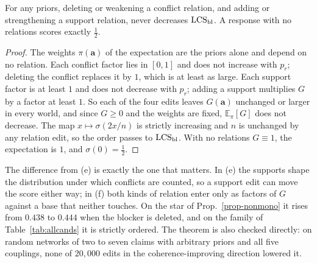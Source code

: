 \begin{theorem}
\label{thm-balanced}
For any priors, deleting or weakening a conflict relation, and adding or strengthening a support
relation, never decreases $\mathrm{LCS}_{\mathrm{bl}}$. A response with no relations scores exactly $\tfrac12$.
\end{theorem}
\begin{proof}
The weights $\pi(\mathbf{a})$ of the expectation are the priors alone and depend on no relation.
Each conflict factor lies in $[0,1]$ and does not increase with $p_r$; deleting the conflict replaces
it by $1$, which is at least as large. Each support factor is at least $1$ and does not decrease
with $p_r$; adding a support multiplies $G$ by a factor at least $1$. So each of the four edits
leaves $G(\mathbf{a})$ unchanged or larger in every world, and since $G\ge0$ and the weights are
fixed, $\mathbb{E}_\pi[G]$ does not decrease. The map $x\mapsto\sigma(2x/n)$ is strictly increasing
and $n$ is unchanged by any relation edit, so the order passes to $\mathrm{LCS}_{\mathrm{bl}}$. With no relations
$G\equiv1$, the expectation is $1$, and $\sigma(0)=\tfrac12$.
\end{proof}

The difference from (e) is exactly the one that matters. In (e) the supports shape the distribution
under which conflicts are counted, so a support edit can move the score either way; in (f) both kinds
of relation enter only as factors of $G$ against a base that neither touches. On
the star of Prop.~\ref{prop-nonmono} it rises from $0.438$ to $0.444$ when the blocker is deleted, and
on the family of Table~\ref{tab:allcands} it is strictly ordered. The theorem is also checked
directly: on random networks of two to seven claims with arbitrary priors and all five couplings, none
of $20{,}000$ edits in the coherence-improving direction lowered it.

